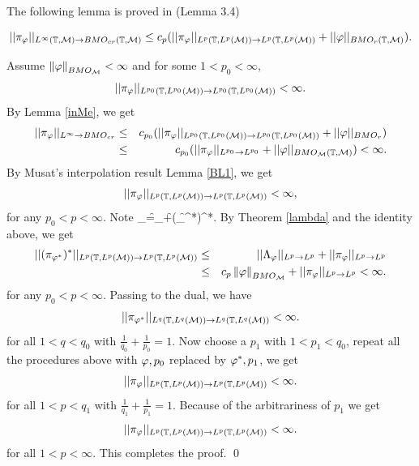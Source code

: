 The following lemma is proved in \cite{Me} (Lemma 3.4)

\begin{lemma} \label{inMe}
\[
||\pi _\varphi||_{L^\infty({\mathbb T},{\mathcal M}) \rightarrow BMO_{cr}({\mathbb T},{\mathcal M})}\leq
c_p(||\pi _\varphi||_{L^p({\mathbb T},{L^p({\mathcal M})})\rightarrow
L^p({\mathbb T},{L^p({\mathcal M})})}+||\varphi||_{BMO_r({\mathbb T},{\mathcal M})}).
\]
\end{lemma}

\medskip
{} Assume $\left\| \varphi\right\| _{BMO_{{\mathcal M}}}<\infty$
and for some $1<p_0<\infty$,
\[
||\pi_\varphi||_{L^{p_0}({\mathbb T},L^{p_0}({\mathcal M}))\rightarrow L^{p_0}({\mathbb T},L^{p_0}({\mathcal M}))}<\infty.
\]
By Lemma \ref{inMe}, we get
\begin{eqnarray}
||\pi_\varphi||_{L^\infty\rightarrow BMO_{cr}}&\leq&
c_{p_0}(||\pi_\varphi||_{L^{p_0}({\mathbb T},L^{p_0}({\mathcal M}))\rightarrow
L^{p_0}({\mathbb T},L^{p_0}({\mathcal M}))}+||\varphi||_{BMO_r}) \nonumber\\
&\leq& c_{p_0}(||\pi_\varphi||_{L^{p_0}\rightarrow
L^{p_0}}+||\varphi||_{BMO_{{\mathcal M}}({\mathbb T},{\mathcal M})})<\infty.
\end{eqnarray}
By Musat's interpolation result Lemma \ref{BL1}, we get
\begin{eqnarray}
||\pi_\varphi||_{L^p({\mathbb T},L^{p}({\mathcal M}))\rightarrow {L^p({\mathbb T},L^{p}({\mathcal M}))}}<\infty,
\end{eqnarray}
for any $p_0<p<\infty.$ Note \be \Lambda_\f=\pi_\f+(\pi_{\f^*})^*.
\ee By Theorem \ref{lambda} and the identity above, we get
\begin{eqnarray}
||(\pi_{\varphi^*})^*||_{L^{p}({\mathbb T},L^{p}({\mathcal M}))\rightarrow
L^{p}({\mathbb T},L^{p}({\mathcal M}))} &\leq& ||\Lambda_\varphi||_{L^{p}\rightarrow
L^{p}}+||\pi_\varphi||_{L^p\rightarrow L^p}\nonumber\\ &\leq& c_p\left\|
\varphi\right\| _{BMO_{{\mathcal M}}}+||\pi_\varphi||_{L^p\rightarrow L^p}<\infty.
\label{b**}
\end{eqnarray}
for any $p_0<p<\infty.$ Passing to the dual, we have
\begin{eqnarray}
||\pi_{\varphi^*}||_{L^{q}({\mathbb T},L^{q}({\mathcal M}))\rightarrow L^{q}({\mathbb T},L^{q}({\mathcal M}))}<\infty.  \label{pib*}
\end{eqnarray}
for all $1<q<q_0$ with $\frac1{q_0}+\frac1{p_0}=1$. Now choose a $p_1$ with $%
1<p_1<q_0$, repeat all the procedures above with $\varphi,p_0$ replaced by $\varphi^*, p_1$, we get
\begin{eqnarray}
||\pi_{\varphi}||_{L^{p}({\mathbb T},L^p({\mathcal M}))\rightarrow L^{p}({\mathbb T},L^{p}({\mathcal M}))}<\infty.  \label{b}
\end{eqnarray}
for all $1<p<q_1$ with $\frac1{q_1}+\frac1{p_1}=1$. Because of the
arbitrariness of $p_1$ we get
\begin{eqnarray}
||\pi_{\varphi}||_{L^{p}({\mathbb T},L^{p}({\mathcal M}))\rightarrow
L^{p}({\mathbb T},L^{p}({\mathcal M}))}<\infty.
\end{eqnarray}
for all $1<p<\infty$. This completes the proof. \qed


